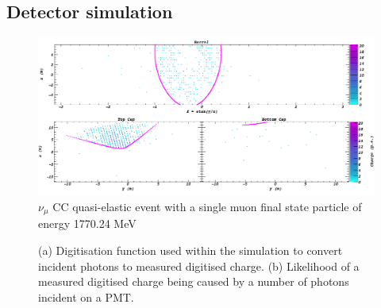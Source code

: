\subsection{Detector simulation} %
\label{sec:chips_monte_carlo_sim} %

\begin{figure} %
    \includegraphics[width=\textwidth]{diagrams/4-chips/sim_event.png}
    \caption[sim event short]
    {$\nu_{\mu}$ CC quasi-elastic event with a single muon final state particle of energy
        1770.24 MeV}
    \label{fig:sim_event}
\end{figure}

\begin{figure} %
    \centering
    \quad
    \caption[Simulation PMT digitisaion function.]
    {(a) Digitisation function used within the simulation to convert incident photons to measured
        digitised charge. (b) Likelihood of a measured digitised charge being caused by a number
        of photons incident on a PMT.}
    \label{fig:digitisation}
\end{figure}
